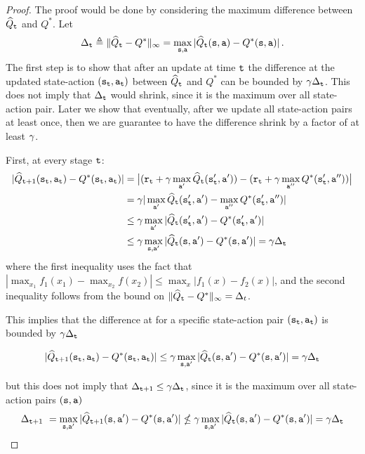 \begin{proof}
The proof would be done by considering the maximum difference between $\widehat{Q}_{\tt t}$ and $Q^*$.
Let
\[
\Delta_{\tt t} \triangleq \|\widehat{Q}_{\tt t}-Q^*\|_\infty =
\max_{{\tt s},{\tt a}}
|\widehat{Q}_{\tt t}({\tt s},{\tt a})-Q^*({\tt s},{\tt a}) | \,.
\]
The first step is to show that after an update at time ${\tt t}$ the difference at the updated state-action $({\tt s}_{\tt t},{\tt a}_{\tt t})$ between $\widehat{Q}_{\tt t}$ and $Q^*$ can be bounded by $\gamma \Delta_{\tt t}$. This does not imply that $\Delta_{{\tt t}}$ would shrink, since it is the maximum over all state-action pair. Later we show that eventually, after we update all state-action pairs at least once, then we are guarantee to have the difference shrink by a factor of at least $\gamma$. 

First, at every stage ${\tt t}$:
\begin{align*}
| \widehat{Q}_{{\tt t}+1}({\tt s}_{\tt t},{\tt a}_{\tt t})-
Q^*({\tt s}_{\tt t},{\tt a}_{\tt t})| &=
\big|({\tt r}_{\tt t}+\gamma\max_{{\tt a}'}
\widehat{Q}_{\tt t}({\tt s}_{{\tt t}}',{\tt a}'))
- ({\tt r}_{\tt t}+\gamma\max_{{\tt a}''} Q^*({\tt s}_{{\tt t}}',{\tt a}'') ) \big| \\
&= \gamma |\max_{{\tt a}'} \widehat{Q}_{\tt t}({\tt s}_{{\tt t}}',{\tt a}') -\max_{{\tt a}''} Q^*({\tt s}_{{\tt t}}',{\tt a}'') | \\
& \le \gamma \max_{{\tt a}'}
|\widehat{Q}_{\tt t}({\tt s}_{{\tt t}}',{\tt a}') -
Q^*({\tt s}_{{\tt t}}',{\tt a}') | \\
&\le \gamma \max_{{\tt s},{\tt a}'}|\widehat{Q}_{\tt t}({\tt s},{\tt a}')-Q^*({\tt s},{\tt a}') |= \gamma \Delta_{\tt t}
\end{align*}
where the first inequality uses the fact that $|\max_{x_1} f_1(x_1)-\max_{x_2}f(x_2)|\leq \max_x|f_1(x)-f_2(x)|$, and the second inequality follows from the bound on $\|\widehat{Q}_{\tt t}-Q^*\|_\infty =\Delta_t $.

This implies that the difference at for a specific state-action pair $({\tt s}_{{\tt t}},{\tt a}_{{\tt t}})$
is bounded by $\gamma\Delta_{{\tt t}}$

\[
|\widehat{Q}_{{\tt t}+1}({\tt s}_{{\tt t}},{\tt a}_{{\tt t}})-Q^{*}({\tt s}_{{\tt t}},{\tt a}_{{\tt t}})|\le\gamma\max_{{\tt s},{\tt a}'}|\widehat{Q}_{{\tt t}}({\tt s},{\tt a}')-Q^{*}({\tt s},{\tt a}')|=\gamma\Delta_{{\tt t}}
\]

but this does not imply that $\Delta_{{\tt t}+1}\leq\gamma\Delta_{{\tt t}}$, since it is
the maximum over all state-action pairs $({\tt s},{\tt a})$
\[
\Delta_{{\tt t}+1}\ = \max_{{\tt s},{\tt a}'}|\widehat{Q}_{{\tt t}+1}({\tt s},{\tt a}')-Q^{*}({\tt s},{\tt a}')|\nleq\gamma\max_{{\tt s},{\tt a}'}|\widehat{Q}_{{\tt t}}({\tt s},{\tt a}')-Q^{*}({\tt s},{\tt a}')|=\gamma\Delta_{{\tt t}}
\]


\end{proof}
